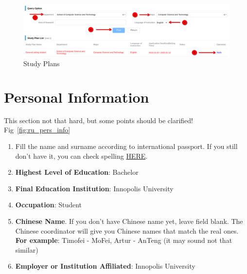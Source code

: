 \begin{figure}[htpb]
    \centering
    \includegraphics[width=\textwidth]{01_russia/imgs/app_3_study_plan}
    \caption{\centering Study Plans}
    \label{fig:ru_study_plan}
\end{figure}








\section{Personal Information}\label{sec:ru_personal_info}

This section not that hard, but some points should be clarified!
Fig~\ref{fig:ru_pers_info}

\begin{enumerate}
    \item Fill the name and surname according to international passport.
        If you still don't have it, you can check spelling
        \href{https://www.gosuslugi.ru/help/faq/foreign_passport/100359}{HERE}.

    \item \textbf{Highest Level of Education}: Bachelor

    \item \textbf{Final Education Institution}: Innopolis University

    \item \textbf{Occupation}: Student

    \item \textbf{Chinese Name}.
        If you don't have Chinese name yet, leave field blank.
        The Chinese coordinator will give you Chinese names that match the real ones. \\
        \textbf{For example}: Timofei - MoFei, Artur - AnTeng (it may sound not that similar)

    \item \textbf{Employer or Institution Affiliated}: Innopolis University
\end{enumerate}


